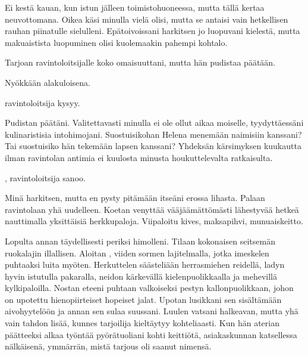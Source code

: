 \indent{}Ei kest\"{a} kauan, kun istun j\"{a}lleen toimistohuoneessa, mutta t\"{a}ll\"{a} kertaa neuvottomana. Oikea k\"{a}si minulla viel\"{a} olisi, mutta se antaisi vain hetkellisen rauhan piinatulle sielulleni. Ep\"{a}toivoissani harkitsen jo luopuvani kielest\"{a}, mutta makuaistista luopuminen olisi kuolemaakin pahempi kohtalo.

\indent{}Tarjoan ravintoloitsijalle koko omaisuuttani, mutta h\"{a}n pudistaa p\"{a}\"{a}t\"{a}\"{a}n. 

\indent{}Ny\"{o}kk\"{a}\"{a}n alakuloisena.

\indent{} ravintoloitsija kysyy. 

\indent{}Pudistan p\"{a}\"{a}t\"{a}ni. Valitettavasti minulla ei ole ollut aikaa moiselle, tyydytt\"{a}ess\"{a}ni kulinaristisia intohimojani. Suostuisikohan Helena menem\"{a}\"{a}n naimisiin kanssani? Tai suostuisiko h\"{a}n tekem\"{a}\"{a}n lapsen kanssani? Yhdeks\"{a}n k\"{a}rsimyksen kuukautta ilman ravintolan antimia ei kuulosta minusta houkuttelevalta ratkaisulta.

\indent{}, ravintoloitsija sanoo. 

\indent{}Min\"{a} harkitsen, mutta en pysty pit\"{a}m\"{a}\"{a}n itse\"{a}ni erossa lihasta. Palaan ravintolaan yh\"{a} uudelleen. Koetan venytt\"{a}\"{a} v\"{a}\"{a}j\"{a}\"{a}m\"{a}tt\"{o}m\"{a}sti l\"{a}hestyv\"{a}\"{a} hetke\"{a} nauttimalla yksitt\"{a}isi\"{a} herkkupaloja. Viipaloitu kives, maksapihvi, munuaiskeitto.

\indent{}Lopulta annan t\"{a}ydellisesti periksi himolleni. Tilaan kokonaisen seitsem\"{a}n ruokalajin illallisen. Aloitan , viiden sormen lajitelmalla, jotka imeskelen puhtaaksi luita my\"{o}ten. Herkuttelen s\"{a}\"{a}steli\"{a}\"{a}n herrasmiehen reidell\"{a}, ladyn hyvin istutulla pakaralla, neidon k\"{a}rkev\"{a}ll\"{a} kielenpuolikkaalla ja mehevill\"{a} kylkipaloilla. Nostan eteeni puhtaan valkoiseksi pestyn kallonpuolikkaan, johon on upotettu hienopiirteiset hopeiset jalat. Upotan lusikkani sen sis\"{a}lt\"{a}m\"{a}\"{a}n aivohyytel\"{o}\"{o}n ja annan sen sulaa suussani. Luulen vatsani halkeavan, mutta yh\"{a} vain tahdon lis\"{a}\"{a}, kunnes tarjoilija kielt\"{a}ytyy kohteliaasti. Kun h\"{a}n aterian p\"{a}\"{a}tteeksi alkaa ty\"{o}nt\"{a}\"{a} py\"{o}r\"{a}tuoliani kohti keitti\"{o}t\"{a}, asiakaskunnan katsellessa n\"{a}lk\"{a}isen\"{a}, ymm\"{a}rr\"{a}n, mist\"{a} tarjous oli saanut nimens\"{a}.

